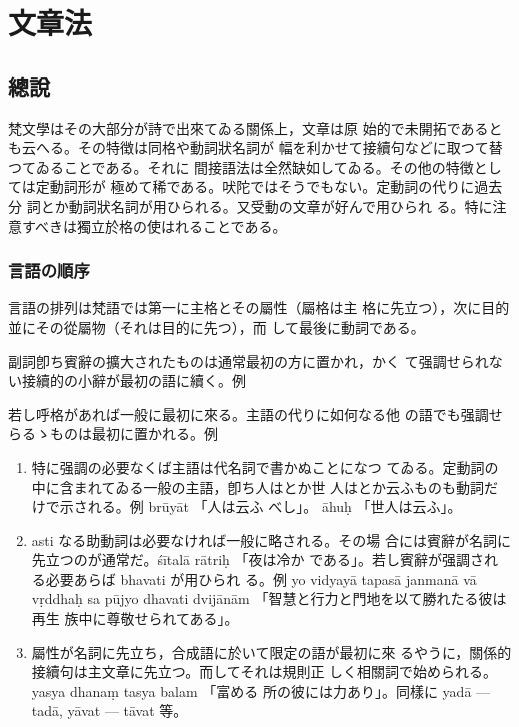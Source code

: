 \chapter{文章法}
\section{總說}
\numberParagraph
梵文學はその大部分が詩で出來てゐる關係上，文章は原
始的で未開拓であるとも云へる。その特徴は同格や動詞狀名詞が
幅を利かせて接續句などに取つて替つてゐることである。それに
間接語法は全然缺如してゐる。その他の特徴としては定動詞形が
極めて稀である。吠陀ではそうでもない。定動詞の代りに過去分
詞とか動詞狀名詞が用ひられる。又受動の文章が好んで用ひられ
る。特に注意すべきは獨立於格の使はれることである。

\subsection{言語の順序}
\numberParagraph \label{np:217}
言語の排列は梵語では第一に主格とその屬性（屬格は主
格に先立つ），次に目的並にその從屬物（それは目的に先つ），而
して最後に動詞である。

副詞卽ち賓辭の擴大されたものは通常最初の方に置かれ，かく
て强調せられない接續的の小辭が最初の語に續く。例



若し呼格があれば一般に最初に來る。主語の代りに如何なる他
の語でも强調せらるゝものは最初に置かれる。例



\begin{enumerate}[label=(\alph*), ref=\alph*]
\item \label{item:217a} 特に强調の必要なくば主語は代名詞で書かぬことになつ
てゐる。定動詞の中に含まれてゐる一般の主語，卽ち人はとか世
人はとか云ふものも動詞だけで示される。例 brūyāt 「人は云ふ
べし」。 āhuḥ 「世人は云ふ」。
\item asti なる助動詞は必要なければ一般に略される。その場
合には賓辭が名詞に先立つのが通常だ。śītalā rātriḥ 「夜は冷か
である」。若し賓辭が强調される必要あらば bhavati が用ひられ
る。例 yo vidyayā tapasā janmanā vā vṛddhaḥ sa pūjyo
dhavati dvijānām 「智慧と行力と門地を以て勝れたる彼は再生
族中に尊敬せられてある」。
\item 屬性が名詞に先立ち，合成語に於いて限定の語が最初に來
るやうに，關係的接續句は主文章に先立つ。而してそれは規則正
しく相關詞で始められる。 yasya dhanaṃ tasya balam 「富める
所の彼には力あり」。同樣に yadā --- tadā, yāvat --- tāvat 等。
\end{enumerate}

